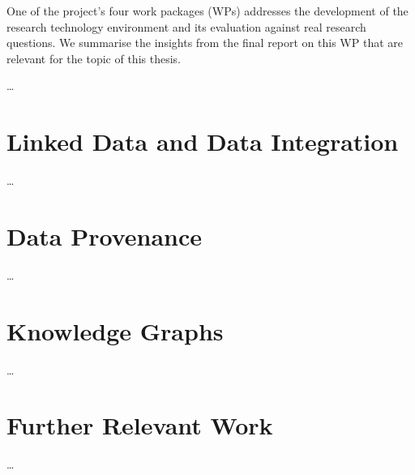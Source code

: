 One of the project's four work packages (WPs)
addresses the development of the research technology environment
and its evaluation against real research questions.
We summarise the insights from the final report on this WP \autocite{Fangerau2022}
that are relevant for the topic of this thesis.





\dots

\section{Linked Data and Data Integration}
\label{sec:linked_data+integration}

\dots


\section{Data Provenance}
\label{sec:data_provenance}

\dots


\section{Knowledge Graphs}
\label{sec:KGs}

\dots


\section{Further Relevant Work}
\label{sec:further}

\dots


